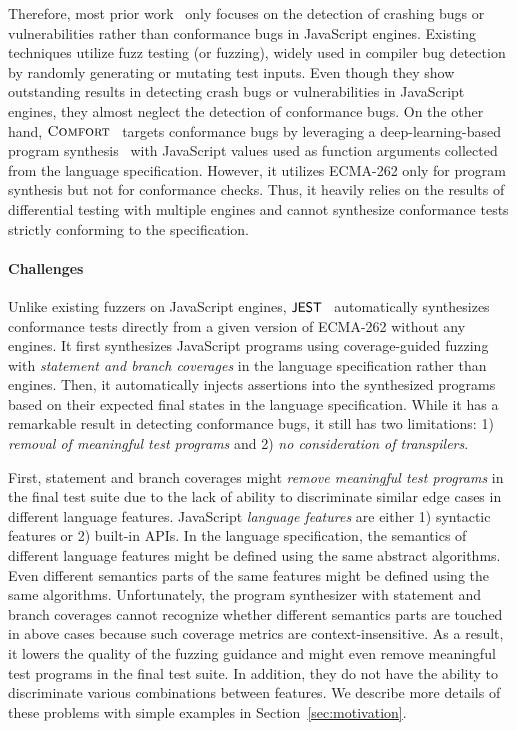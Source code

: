 Therefore, most prior work~\cite{montage, langfuzz, die, favocado,
codealchemist, sofi} only focuses on the detection of crashing bugs or
vulnerabilities rather than conformance bugs in JavaScript engines.
%
Existing techniques utilize fuzz testing (or fuzzing), widely used in compiler
bug detection by randomly generating or mutating test inputs.
%
Even though they show outstanding results in detecting crash bugs or
vulnerabilities in JavaScript engines, they almost neglect the detection of
conformance bugs.
%
On the other hand, $\textsc{Comfort}$~\cite{comfort} targets conformance bugs by
leveraging a deep-learning-based program synthesis~\cite{deep-smith} with
JavaScript values used as function arguments collected from the language
specification.
%
However, it utilizes ECMA-262 only for program synthesis but not for conformance
checks.
%
Thus, it heavily relies on the results of differential testing with multiple
engines and cannot synthesize conformance tests strictly conforming to the
specification.


\paragraph{\textbf{Challenges}}
%
Unlike existing fuzzers on JavaScript engines, $\textsf{\small JEST}$~\cite{jest} automatically
synthesizes conformance tests directly from a given version of ECMA-262 without
any engines.
%
It first synthesizes JavaScript programs using coverage-guided
fuzzing~\cite{afl} with \textit{statement and branch coverages} in the language
specification rather than engines.
%
Then, it automatically injects assertions into the synthesized programs based on
their expected final states in the language specification.
%
While it has a remarkable result in detecting conformance bugs, it still has two
limitations: 1) \textit{removal of meaningful test programs} and 2) \textit{no
consideration of transpilers}.


First, statement and branch coverages might \textit{remove meaningful test
programs} in the final test suite due to the lack of ability to discriminate
similar edge cases in different language features.
%
JavaScript \textit{language features} are either 1) syntactic features or 2)
built-in APIs.
%
In the language specification, the semantics of different language features
might be defined using the same abstract algorithms.
%
Even different semantics parts of the same features might be defined using the
same algorithms.
%
Unfortunately, the program synthesizer with statement and branch coverages
cannot recognize whether different semantics parts are touched in above cases
because such coverage metrics are context-insensitive.
%
As a result, it lowers the quality of the fuzzing guidance and might even remove
meaningful test programs in the final test suite.
%
In addition, they do not have the ability to discriminate various combinations
between features.
%
We describe more details of these problems with simple examples in
Section~\ref{sec:motivation}.

